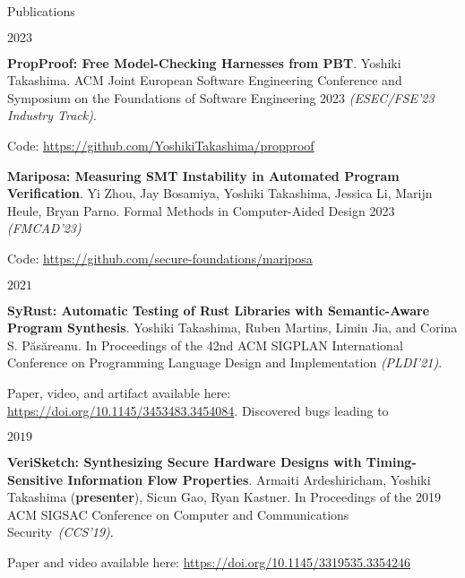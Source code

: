\documentclass{resume} %
\begin{document}
\begin{rSection}{Publications}

  \begin{rSubsection}{}{$2023$}{}{}
  \item \textbf{PropProof: Free Model-Checking Harnesses from PBT}.
    Yoshiki Takashima. ACM Joint European Software Engineering
    Conference and Symposium on the Foundations of Software
    Engineering 2023 \textit{(ESEC/FSE’23 Industry Track)}.

    Code: \href{https://github.com/YoshikiTakashima/propproof}
    {https://github.com/YoshikiTakashima/propproof}

  \item \textbf{Mariposa: Measuring SMT Instability in Automated
      Program Verification}. Yi Zhou, Jay Bosamiya, Yoshiki Takashima,
    Jessica Li, Marijn Heule, Bryan Parno. Formal Methods in
    Computer-Aided Design 2023 \textit{(FMCAD'23)}

    Code: \href{https://github.com/secure-foundations/mariposa}
    {https://github.com/secure-foundations/mariposa}
  \end{rSubsection}\newpage

  \begin{rSubsection}{}{$2021$}{}{}
  \item \textbf{SyRust: Automatic Testing of Rust Libraries
    with Semantic-Aware Program Synthesis}.
    Yoshiki Takashima, Ruben Martins, Limin Jia, and Corina
    S. P\u{a}s\u{a}reanu.  In Proceedings of the 42nd
    ACM SIGPLAN International Conference on Programming Language
    Design and Implementation \textit{(PLDI’21)}.

    Paper, video, and artifact available here:
    \href{https://doi.org/10.1145/3453483.3454084}
    {https://doi.org/10.1145/3453483.3454084}. Discovered bugs leading to \href{}{}
  \end{rSubsection}

  \begin{rSubsection}{}{$2019$}{}{}
  \item \textbf{VeriSketch: Synthesizing Secure Hardware Designs with
      Timing-Sensitive Information Flow Properties}.  Armaiti
    Ardeshiricham, Yoshiki Takashima (\textbf{presenter}), Sicun Gao,
    Ryan Kastner. In Proceedings of the 2019 ACM SIGSAC Conference on
    Computer and Communications Security~\textit{(CCS'19)}.

    Paper and video available here:
    \href{https://dl.acm.org/doi/abs/10.1145/3319535.3354246}
    {https://doi.org/10.1145/3319535.3354246}
  \end{rSubsection}
\end{rSection}
\end{document}
